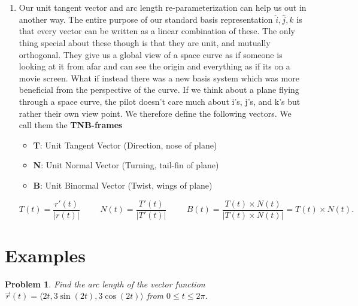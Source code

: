 \documentclass[11pt]{article}
\newtheorem{problem}{Problem}
\begin{document}
\begin{enumerate}
\item Our unit tangent vector and arc length re-parameterization can help us out in another way. The entire purpose of our standard basis representation $\hat{i},\hat{j},\hat{k}$ is that every vector can be written as a linear combination of these. The only thing special about these though is that they are unit, and mutually orthogonal. They give us a global view of a space curve as if someone is looking at it from afar and can see the origin and everything as if its on a movie screen. What if instead there was a new basis system which was more beneficial from the perspective of the curve. If we think about a plane flying through a space curve, the pilot doesn't care much about i's, j's, and k's but rather their own view point. We therefore define the following vectors. We call them the \textbf{TNB-frames}

\begin{itemize}
    \item \textbf{T}: Unit Tangent Vector (Direction, nose of plane)
    \item \textbf{N}: Unit Normal Vector (Turning, tail-fin of plane)
    \item \textbf{B}: Unit Binormal Vector (Twist, wings of plane)
\end{itemize}

\begin{equation*}
  T(t) = \frac{r'(t)}{|r(t)|} \hspace{1cm} N(t) = \frac{T'(t)}{|T'(t)|} \hspace{1cm} B(t) = \frac{T(t) \times N(t)}{|T(t) \times N(t)|}=T(t)\times N(t).
\end{equation*}







   \end{enumerate}

\newpage


\section{Examples}

\begin{problem}
    Find the arc length of the vector function $\vec{r}(t) = \langle 2t, 3\sin(2t), 3\cos(2t) \rangle$ from $0\leq t \leq 2\pi$.
\end{problem}

\vspace{6cm}
\end{document}
